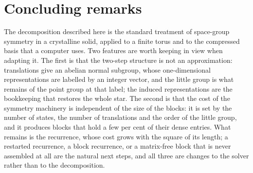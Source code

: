 \documentclass[12pt]{article}
\begin{document}
\section{Concluding remarks}

The decomposition described here is the standard treatment of space-group
symmetry in a crystalline solid, applied to a finite torus and to the compressed
basis that a computer uses. Two features are worth keeping in view when adapting
it. The first is that the two-step structure is not an approximation: translations
give an abelian normal subgroup, whose one-dimensional representations are
labelled by an integer vector, and the little group is what remains of the point
group at that label; the induced representations are the bookkeeping that
restores the whole star. The second is that the cost of the symmetry machinery is
independent of the size of the blocks: it is set by the number of states, the
number of translations and the order of the little group, and it produces blocks
that hold a few per cent of their dense entries. What remains is the recurrence,
whose cost grows with the square of its length; a restarted recurrence, a block
recurrence, or a matrix-free block that is never assembled at all are the natural
next steps, and all three are changes to the solver rather than to the
decomposition.



\end{document}
